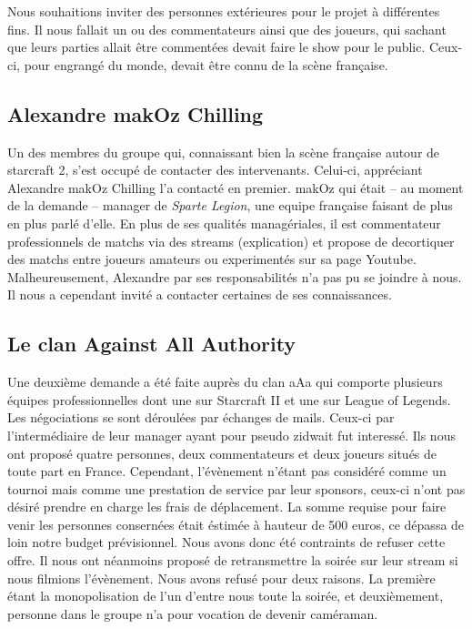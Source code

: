 Nous souhaitions inviter des personnes extérieures pour le projet à
différentes fins. Il nous fallait un ou des commentateurs ainsi que des
joueurs, qui sachant que leurs parties allait être commentées devait faire
le show pour le public. Ceux-ci, pour engrangé du monde, devait être
connu de la scène française.

\subsection{Alexandre \og makOz \fg{} Chilling}%
\label{sub:alexandre_makOz_chilling}

Un des membres du groupe qui, connaissant bien la scène française autour
de starcraft 2, s'est occupé de contacter des intervenants.  Celui-ci,
appréciant Alexandre \og makOz \fg{} Chilling l'a contacté en premier. makOz qui
était -- au moment de la demande -- manager de \emph{Sparte Legion}, une equipe
française faisant de plus en plus parlé d'elle. En plus de ses qualités
managériales, il est commentateur professionnels de matchs via des
streams (explication) et propose de decortiquer des matchs entre joueurs
amateurs ou experimentés sur sa page Youtube. Malheureusement, Alexandre
par ses responsabilités n'a pas pu se joindre à nous. Il nous a
cependant invité a contacter certaines de ses connaissances.

\subsection{Le clan \og Against All Authority \fg{}}%
\label{sub:le_clan_all_against_authority}

Une deuxième demande a été faite auprès du clan \og aAa \fg{} qui
comporte plusieurs équipes professionnelles dont une sur Starcraft II et
une sur League of Legends. Les négociations se sont déroulées par
échanges de mails.  Ceux-ci par l'intermédiaire de leur manager ayant
pour pseudo \og zidwait \fg{} fut interessé. Ils nous ont proposé quatre
personnes, deux commentateurs et deux joueurs situés de toute part en
France.  Cependant, l'évènement n'étant pas considéré comme un tournoi
mais comme une prestation de service par leur sponsors, ceux-ci n'ont
pas désiré prendre en charge les frais de déplacement. La somme requise
pour faire venir les personnes consernées était éstimée à hauteur de 500
euros, ce dépassa de loin notre budget prévisionnel. Nous avons donc été
contraints de refuser cette offre. Il nous ont néanmoins proposé de
retransmettre la soirée sur leur stream si nous filmions l'évènement.
Nous avons refusé pour deux raisons. La première étant la monopolisation
de l'un d'entre nous toute la soirée, et deuxièmement, personne dans le
groupe n'a pour vocation de devenir caméraman.

